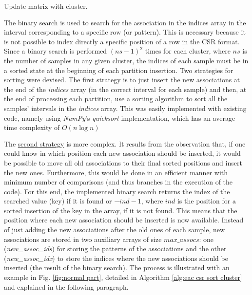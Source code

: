 \begin{algorithm}
\caption{Update matrix with cluster.}\label{alg:eac csr update cluster}
\begin{algorithmic}[1]
		\Else
            \EndIf
		\EndIf
	\EndFor
\EndFor
\EndProcedure
\end{algorithmic}
\end{algorithm}

The binary search is used to search for the association in the indices array in the interval corresponding to a specific row (or pattern).
This is necessary because it is not possible to index directly a specific position of a row in the CSR format.
Since a binary search is performed $(ns - 1)^2$ times for each cluster, where $ns$ is the number of samples in any given cluster, the indices of each sample must be in a sorted state at the beginning of each partition insertion.
Two strategies for sorting were devised.
The \underline{first strategy} is to just insert the new associations at the end of the \emph{indices} array (in the correct interval for each sample) and then, at the end of processing each partition, use a sorting algorithm to sort all the samples' intervals in the \emph{indices} array.
This was easily implemented with existing code, namely using \emph{NumPy}'s \emph{quicksort} implementation, which has an average time complexity of $O(n \log n)$

The \underline{second strategy} is more complex.
It results from the observation that, if one could know in which position each new association should be inserted, it would be possible to move all old associations to their final sorted positions and insert the new ones.
Furthermore, this would be done in an efficient manner with minimum number of comparisons (and thus branches in the execution of the code).
For this end, the implemented binary search returns the index of the searched value (key) if it is found or $-ind -1$, where $ind$ is the position for a sorted insertion of the key in the array, if it is not found.
This means that the position where each new association should be inserted is now available.
Instead of just adding the new associations after the old ones of each sample, new associations are stored in two auxiliary arrays of size $max\_assocs$: one (\emph{new\_assoc\_ids}) for storing the patterns of the associations and the other (\emph{new\_assoc\_idx}) to store the indices where the new associations should be inserted (the result of the binary search).
The process is illustrated with an example in Fig. \ref{fig:normal part}, detailed in Algorithm \ref{alg:eac csr sort cluster} and explained in the following paragraph.


